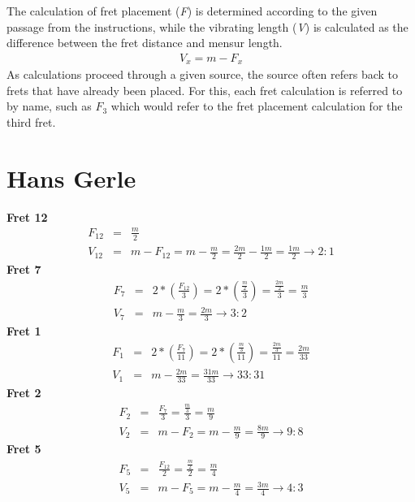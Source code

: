The calculation of fret placement (\textit{F}) is determined according to the given
passage from the instructions, while the vibrating length (\textit{V}) is calculated as
the difference between the fret distance and mensur length.
\begin{eqnarray*}
    V_x = m - F_x
\end{eqnarray*}
As calculations proceed through a given source, the source often refers back to frets
that have already been placed.  For this, each fret calculation is referred to by name,
such as $F_{3}$ which would refer to the fret placement calculation for the third fret.

\linespread{1}
\section{Hans Gerle}
\textbf{Fret 12}
\begin{eqnarray*}
    F_{12}
        &=& \frac{m}{2} \\
    V_{12}
        &=& m - F_{12}
        = m - \frac{m}{2}
        = \frac{2m}{2} - \frac{1m}{2}
        = \frac{1m}{2}
        \to 2:1
\end{eqnarray*}
\textbf{Fret 7}
\begin{eqnarray*}
    F_{7}
        &=& 2 * ( \frac{F_{12}}{3} )
        = 2 * ( \frac{\frac{m}{2}}{3} )
        = \frac{\frac{2m}{2}}{3}
        = \frac{m}{3} \\
    V_{7} 
        &=& m - \frac{m}{3}
        = \frac{2m}{3}
        \to 3:2
\end{eqnarray*}
\textbf{Fret 1}
\begin{eqnarray*}
    F_{1}
        &=& 2 * ( \frac{F_{7}}{11} )
        = 2 * ( \frac{\frac{m}{3}}{11} )
        = \frac{\frac{2m}{3}}{11}
        = \frac{2m}{33} \\
    V_{1}
        &=& m - \frac{2m}{33}
        = \frac{31m}{33}
        \to 33:31
\end{eqnarray*}
\textbf{Fret 2}
\begin{eqnarray*}
    F_{2}
        &=& \frac{F_{7}}{3}
        = \frac{\frac{m}{3}}{3}
        = \frac{m}{9} \\
    V_{2}
        &=& m - F_{2}
        = m - \frac{m}{9}
        = \frac{8m}{9}
        \to 9:8
\end{eqnarray*}
\textbf{Fret 5}
\begin{eqnarray*}\label{Gr-5}
    F_{5}
        &=& \frac{F_{12}}{2}
        = \frac{\frac{m}{2}}{2}
        = \frac{m}{4} \\
    V_{5}
        &=& m - F_{5}
        = m - \frac{m}{4}
        = \frac{3m}{4}
        \to 4:3
\end{eqnarray*}
